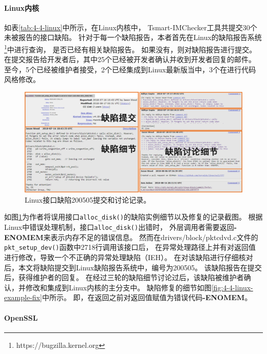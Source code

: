 

\paragraph{Linux内核}
如表\ref{tab:4-4-linux}中所示，在Linux内核中，
Tsmart-IMChecker工具共提交30个未被报告的接口缺陷。
针对于每一个缺陷报告，本者首先在Linux的缺陷报告系统\footnote{https://bugzilla.kernel.org}中进行查询，
是否已经有相关缺陷报告。
如果没有，则对缺陷报告进行提交。
在提交报告给开发者后，其中25个已经被开发者确认并收到开发者回复的邮件。
至今，5个已经被维护者接受，2个已经集成到Linux最新版当中，3个在进行代码风格修改。

\begin{figure}[b]
	\centering
	\includegraphics[width=\linewidth]{figures/cp4-linux-example.png}
	\caption{
		Linux接口缺陷200505提交和讨论记录。
	}
	\label{fig:4-4-linux-example}
\end{figure}




如图\ref{fig:4-4-linux-example}为作者将误用接口\texttt{alloc\_disk()}的缺陷实例细节以及修复的记录截图。
根据Linux中错误处理机制，接口\texttt{alloc\_disk()}出错时，
外层调用者需要返回\textbf{-ENOMEM}来表示内存不足的错误信息。
然而在drivers/block/pktcdvd.c文件的\texttt{pkt\_setup\_dev()}函数中2718行调用该接口后，
在异常处理路径上并有对返回值进行修改，导致一个不正确的异常处理缺陷（IEH）。
在对该缺陷进行仔细核对后，本文将缺陷提交到Linux缺陷报告系统中，编号为200505。
该缺陷报告在提交后，获得维护者的回复。
在经过三轮的缺陷细节讨论过后，该缺陷被维护者确认，并修改和集成到Linux内核的主分支中。
缺陷修复的细节如图\ref{fig:4-4-linux-example-fix}中所示。
即，在返回之前对返回值赋值为错误代码\textbf{-ENOMEM}。


\paragraph{OpenSSL}


